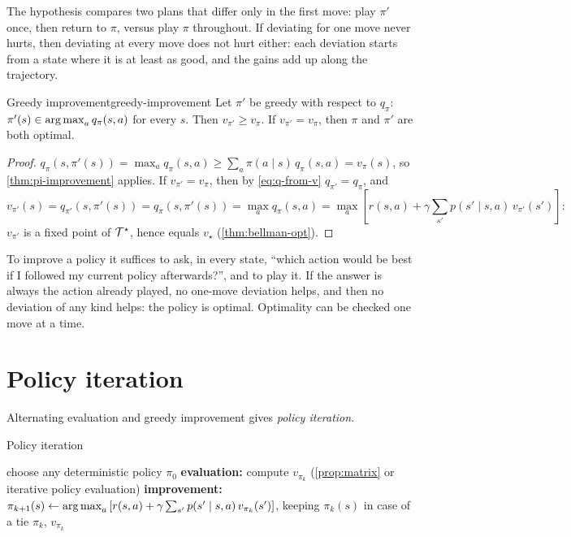 \begin{intuition}
  The hypothesis compares two plans that differ only in the first move:
  play $\pi'$ once, then return to $\pi$, versus play $\pi$ throughout. If
  deviating for one move never hurts, then deviating at every move does not
  hurt either: each deviation starts from a state where it is at least as
  good, and the gains add up along the trajectory.
\end{intuition}

\begin{corollary}{Greedy improvement}{greedy-improvement}
  Let $\pi'$ be greedy with respect to $q_\pi$: $\pi'(s) \in \operatorname*{arg\,max}_a
  q_\pi(s, a)$ for every $s$. Then $v_{\pi'} \geq v_\pi$. If $v_{\pi'} =
  v_\pi$, then $\pi$ and $\pi'$ are both optimal.
\end{corollary}

\begin{proof}
  $q_\pi(s, \pi'(s)) = \max_a q_\pi(s, a) \geq \sum_a \pi(a \mid s)\,
  q_\pi(s, a) = v_\pi(s)$, so \cref{thm:pi-improvement} applies. If
  $v_{\pi'} = v_\pi$, then by \eqref{eq:q-from-v} $q_{\pi'} = q_\pi$, and
  \begin{equation*}
    v_{\pi'}(s) = q_{\pi'}(s, \pi'(s)) = q_\pi(s, \pi'(s))
    = \max_a q_\pi(s, a)
    = \max_a \left[ r(s, a) + \gamma \sum_{s'} p(s' \mid s, a)\,
      v_{\pi'}(s') \right]:
  \end{equation*}
  $v_{\pi'}$ is a fixed point of $\mathcal{T}^\star$, hence equals $v_\star$
  (\cref{thm:bellman-opt}).
\end{proof}

\begin{intuition}
  To improve a policy it suffices to ask, in every state, ``which action
  would be best if I followed my current policy afterwards?'', and to play
  it. If the answer is always the action already played, no one-move
  deviation helps, and then no deviation of any kind helps: the policy is
  optimal. Optimality can be checked one move at a time.
\end{intuition}

\section{Policy iteration}

Alternating evaluation and greedy improvement gives \emph{policy
iteration}.

\begin{algobox}{Policy iteration}
  \begin{algorithmic}[1]
    \State choose any deterministic policy $\pi_0$
      \State \textbf{evaluation:} compute $v_{\pi_k}$
        (\cref{prop:matrix} or iterative policy evaluation)
      \State \textbf{improvement:} $\pi_{k+1}(s) \gets \operatorname*{arg\,max}_a \left[
        r(s, a) + \gamma \sum_{s'} p(s' \mid s, a)\, v_{\pi_k}(s') \right]$,
        keeping $\pi_k(s)$ in case of a tie
       \Return $\pi_k$, $v_{\pi_k}$ \EndIf
    \EndFor
  \end{algorithmic}
\end{algobox}

